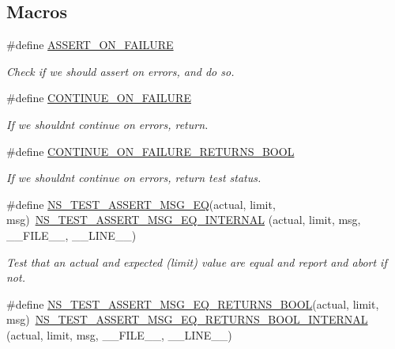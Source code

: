 \subsection*{Macros}
\begin{DoxyCompactItemize}
\item 
\#define \hyperlink{group__testing_ga044d7c8c214fe3761af96ee3cbe2edc3}{A\+S\+S\+E\+R\+T\+\_\+\+O\+N\+\_\+\+F\+A\+I\+L\+U\+RE}
\begin{DoxyCompactList}\small\item\em Check if we should assert on errors, and do so. \end{DoxyCompactList}\item 
\#define \hyperlink{group__testing_ga6f2bed856695445564c93cd367c69ea0}{C\+O\+N\+T\+I\+N\+U\+E\+\_\+\+O\+N\+\_\+\+F\+A\+I\+L\+U\+RE}
\begin{DoxyCompactList}\small\item\em If we shouldn\textquotesingle{}t continue on errors, return. \end{DoxyCompactList}\item 
\#define \hyperlink{group__testing_gac69c0f4943a60d1dcecdcd793f905449}{C\+O\+N\+T\+I\+N\+U\+E\+\_\+\+O\+N\+\_\+\+F\+A\+I\+L\+U\+R\+E\+\_\+\+R\+E\+T\+U\+R\+N\+S\+\_\+\+B\+O\+OL}
\begin{DoxyCompactList}\small\item\em If we shouldn\textquotesingle{}t continue on errors, return test status. \end{DoxyCompactList}\item 
\#define \hyperlink{group__testing_ga2a9d78cffb3db8e867c35fff0b698cf5}{N\+S\+\_\+\+T\+E\+S\+T\+\_\+\+A\+S\+S\+E\+R\+T\+\_\+\+M\+S\+G\+\_\+\+EQ}(actual,  limit,  msg)~\hyperlink{group__testingimpl_gaa9d54a0bd3ffaa7f4db82c4a6c1fb83b}{N\+S\+\_\+\+T\+E\+S\+T\+\_\+\+A\+S\+S\+E\+R\+T\+\_\+\+M\+S\+G\+\_\+\+E\+Q\+\_\+\+I\+N\+T\+E\+R\+N\+AL} (actual, limit, msg, \+\_\+\+\_\+\+F\+I\+L\+E\+\_\+\+\_\+, \+\_\+\+\_\+\+L\+I\+N\+E\+\_\+\+\_\+)
\begin{DoxyCompactList}\small\item\em Test that an actual and expected (limit) value are equal and report and abort if not. \end{DoxyCompactList}\item 
\#define \hyperlink{group__testing_ga5649dddde97a42ddfd4cd88aa53b37c6}{N\+S\+\_\+\+T\+E\+S\+T\+\_\+\+A\+S\+S\+E\+R\+T\+\_\+\+M\+S\+G\+\_\+\+E\+Q\+\_\+\+R\+E\+T\+U\+R\+N\+S\+\_\+\+B\+O\+OL}(actual,  limit,  msg)~\hyperlink{group__testingimpl_gaa154d45ddff16a28ea0a9f3fe890591d}{N\+S\+\_\+\+T\+E\+S\+T\+\_\+\+A\+S\+S\+E\+R\+T\+\_\+\+M\+S\+G\+\_\+\+E\+Q\+\_\+\+R\+E\+T\+U\+R\+N\+S\+\_\+\+B\+O\+O\+L\+\_\+\+I\+N\+T\+E\+R\+N\+AL} (actual, limit, msg, \+\_\+\+\_\+\+F\+I\+L\+E\+\_\+\+\_\+, \+\_\+\+\_\+\+L\+I\+N\+E\+\_\+\+\_\+)

\end{DoxyCompactItemize}
